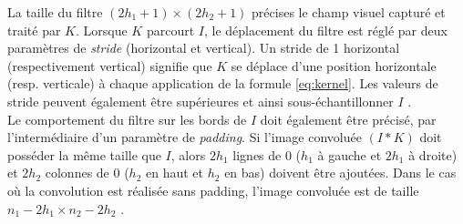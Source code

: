 	La taille du filtre $(2h_1+1)\times(2h_2+1)$ précises le champ visuel capturé et traité par $K$.
	Lorsque $K$ parcourt $I$, le déplacement du filtre est réglé par deux paramètres de \textit{stride} (horizontal et vertical). Un stride de 1 horizontal (respectivement vertical) signifie que $K$ se déplace d'une position horizontale (resp. verticale) à chaque application de la formule \ref{eq:kernel}. Les valeurs de stride peuvent également être supérieures et ainsi sous-échantillonner $I$ \cite{goodfellow2016deep, antoine2018apprentissage}.\\
	Le comportement du filtre sur les bords de $I$ doit également être précisé, par l'intermédiaire d'un paramètre de \textit{padding}. Si l'image convoluée $(I\ast K)$ doit posséder la même taille que $I$, alors $2h_{1}$ lignes de 0 ($h_1$ à gauche et $2h_{1}$ à droite) et $2h_{2}$ colonnes de $0$ ($h_2$ en haut et $h_2$ en bas) doivent être ajoutées. Dans le cas où la convolution est réalisée sans padding, l'image convoluée est de taille $n_{1} - 2h_{1} \times n_{2} - 2h_{2}$ \cite{antoine2018apprentissage}.
	
	
		
	

